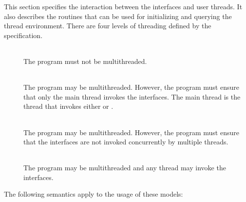 This section specifies the interaction between the \openshmem interfaces and
user threads.  It also describes the routines that can be used for initializing and
querying the thread environment. There are four levels of threading defined by
the \openshmem specification.

\begin{description}
\item[] \hfill \\
The \openshmem program must not be multithreaded.

\item[] \hfill \\
The \openshmem program may be multithreaded. However, the program must ensure
that only the main thread invokes the \openshmem interfaces. The main thread
is the thread that invokes either  or .

\item[] \hfill \\
The \openshmem program may be multithreaded. However, the program must ensure
that the \openshmem interfaces are not invoked concurrently by multiple threads.

\item[] \hfill \\
The \openshmem program may be multithreaded and any thread may invoke the \openshmem
interfaces.
\end{description}

\noindent The following semantics apply to the usage of these models:

